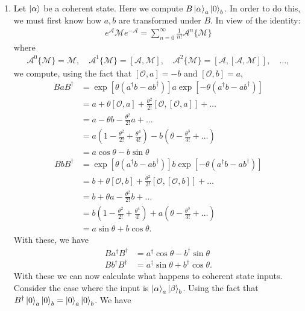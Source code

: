 \documentclass{article}
\theoremstyle{definition}
\newcommand{\al}{\alpha}
\newcommand{\be}{\beta}
\newcommand{\f}[2]{\frac{#1}{#2}}
\newcommand{\lp}{\left(}
\newcommand{\rp}{\right)}
\newcommand{\lb}{\left[}
\newcommand{\rb}{\right]}
\begin{document}
\begin{enumerate}[label=\alph*)]
\item Let $\ket{\al}$ be a coherent state. Here we compute $B \ket{\al}_a \ket{0}_b $. In order to do this, we must first know how $a,b$ are transformed under $B$. In view of the identity:
\begin{align*}
e^{\mathcal{A}}  \mathcal{M} e^{-\mathcal{A}} = \sum_{n=0}^\infty \f{1}{n!} \mathcal{A}^n \{ \mathcal{M} \}
\end{align*}
where 
\begin{align*}
\mathcal{A}^0 \{ \mathcal{M} \}= \mathcal{M}, \quad \mathcal{A}^1 \{ \mathcal{M} \} = [\mathcal{A}, \mathcal{M}], \quad \mathcal{A}^2 \{ \mathcal{M} \} = [\mathcal{A}, [\mathcal{A}, \mathcal{M}]], \quad \dots,
\end{align*}
we compute, using the fact that $[\mathcal{O},a] = -b$ and $[\mathcal{O},b] = a$,
\begin{align*}
B a B^\dagger 
&= \exp\lb \theta\lp a^\dagger b -ab^\dagger \rp \rb   a \exp\lb -\theta \lp a^\dagger b - ab^\dagger \rp \rb \\
&= a + \theta[ \mathcal{O},a] + \f{\theta^2}{2!}[\mathcal{O}, [\mathcal{O}, a]] + \dots \\
&= a - \theta b - \f{\theta^2}{2!} a + \dots \\
&= a\lp 1 - \f{\theta^2}{2!} + \f{\theta^4}{4!} \rp - b \lp \theta - \f{\theta^3}{3!} + \dots \rp \\
&= a\cos\theta - b\sin\theta
\end{align*}
\begin{align*}
B b B^\dagger 
&= \exp\lb \theta\lp a^\dagger b -ab^\dagger \rp \rb   b \exp\lb -\theta \lp a^\dagger b - ab^\dagger \rp \rb \\
&= b + \theta[ \mathcal{O},b] + \f{\theta^2}{2!}[\mathcal{O}, [\mathcal{O}, b]] + \dots \\
&= b + \theta a - \f{\theta^2}{2!} b + \dots \\
&= b\lp 1 - \f{\theta^2}{2!} + \f{\theta^4}{4!} \rp + a \lp \theta - \f{\theta^3}{3!} + \dots \rp \\
&= a\sin\theta + b\cos\theta.
\end{align*}
With these, we have
\begin{align*}
B a^\dagger B^\dagger &= a^\dagger \cos\theta - b^\dagger \sin\theta \\
B b^\dagger B^\dagger &= a^\dagger \sin\theta + b^\dagger \cos\theta.
\end{align*}
With these we can now calculate what happens to coherent state inputs. Consider the case where the input is $\ket{\al}_a \ket{\be}_b$. Using the fact that $B^\dagger \ket{0}_a\ket{0}_b = \ket{0}_a \ket{0}_b$. We have

\end{enumerate}
\end{document}
